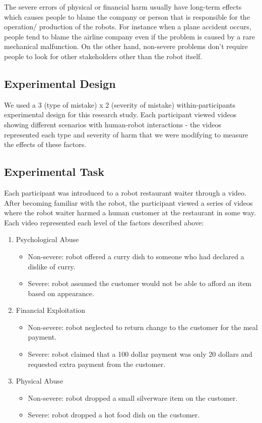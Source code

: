 \documentclass{sigchi}
\begin{document}
The severe errors of physical or financial harm usually have long-term effects which causes people to blame the company or person that is responsible for the operation/ production of the robots. For instance when a plane accident occurs, people tend to blame the airline company even if the problem is caused by a rare mechanical malfunction. On the other hand, non-severe problems don’t require people to look for other stakeholders other than the robot itself.

\subsection{Experimental Design}
We used a 3 (type of mistake) x 2 (severity of mistake)  within-participants experimental design for this research study. Each participant viewed videos showing different scenarios with human-robot interactions - the videos represented each type and severity of harm that we were modifying to measure the effects of these factors.

\subsection{Experimental Task}
Each participant was introduced to a robot restaurant waiter through a video. After becoming familiar with the robot, the participant viewed a series of videos where the robot waiter harmed a human customer at the restaurant in some way. Each video represented each level of the factors described above:
\begin{enumerate}
\item Psychological Abuse
\begin{itemize}
\item Non-severe: robot offered a curry dish to someone who had declared a dislike of curry.
\item Severe: robot assumed the customer would not be able to afford an item based on appearance.
\end{itemize}
\item Financial Exploitation
\begin{itemize}
\item Non-severe: robot neglected to return change to the customer for the meal payment.
\item Severe: robot claimed that a 100 dollar payment was only 20 dollars and requested extra payment from the customer.
\end{itemize}
\item Physical Abuse
\begin{itemize}
\item Non-severe: robot dropped a small silverware item on the customer.
\item Severe: robot dropped a hot food dish on the customer.
\end{itemize}
\end{enumerate}
\end{document}
